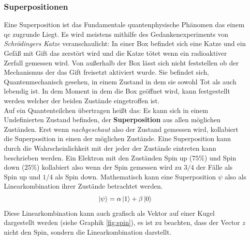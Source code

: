 \subsubsection{Superpositionen}
Eine Superposition ist das Fundamentale quantenphysische Phänomen das einem \ac{qc} zugrunde Liegt.
Es wird meistens mithilfe des Gedankenexperiments von \cite[\$5]{schrodinger_gegenwartige_1935} \textit{Schrödingers Katze} veranschaulicht: In einer Box befindet sich eine Katze und ein Gefäß mit Gift das zerstört wird und die Katze tötet wenn ein radioaktiver Zerfall gemessen wird. Von außerhalb der Box lässt sich nicht feststellen ob der Mechanismus der das Gift freisetzt aktiviert wurde. Sie befindet sich, Quantenmechanisch gesehen, in einem Zustand in dem sie sowohl Tot als auch lebendig ist. In dem Moment in dem die Box geöffnet wird, kann festgestellt werden welcher der beiden Zustände eingetroffen ist.\\
Auf ein Quantenteilchen übertragen heißt das: Es kann sich in einem Undefinierten Zustand befinden, der \textbf{Superposition} aus allen möglichen Zuständen. Erst wenn \textit{nachgeschaut} also der Zustand gemessen wird, kollabiert die Superposition in einen der möglichen Zustände. Eine Superposition kann durch die Wahrscheinlichkeit mit der jeder der Zustände eintreten kann beschrieben werden. Ein Elektron mit den Zuständen Spin up ($75\%$) und Spin down ($25\%$) kollabiert also wenn der Spin gemessen wird zu $3/4$ der Fälle als Spin up und $1/4$ als Spin down.
Mathematisch kann eine Superposition $\psi$ also als Linearkombination ihrer Zustände betrachtet werden. 
\begin{equation}
    \ket{\psi } = \alpha \ket{1} + \beta \ket{0} \\
\end{equation}
Diese Linearkombination kann auch grafisch als Vektor auf einer Kugel dargestellt werden (siehe Graphik \ref{fig:spin}), es ist zu beachten, dass der Vector \textit{z} nicht den Spin, sondern die Linearkombination darstellt.

